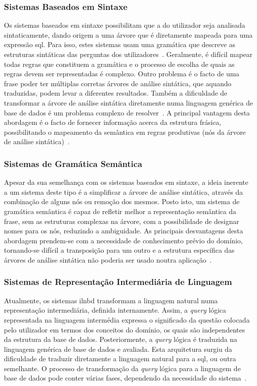 \subsubsection{Sistemas Baseados em Sintaxe}
Os sistemas baseados em sintaxe possibilitam que a  do utilizador seja analisada sintaticamente, dando origem a uma árvore que é diretamente mapeada para uma expressão \gls{sql}. Para isso, estes sistemas usam uma gramática que descreve as estruturas sintáticas das perguntas dos utilizadores~\parencite{nlidb_brief_review}. Geralmente, é difícil mapear todas regras que constituem a gramática e o processo de escolha de quais as regras devem ser representadas é complexo. Outro problema é o facto de uma frase poder ter múltiplas corretas árvores de análise sintática, que aquando traduzidas, podem levar a diferentes resultados. Também a dificuldade de transformar a árvore de análise sintática diretamente numa linguagem genérica de base de dados é um problema complexo de resolver~\parencite{survey_nlidb}. A principal vantagem desta abordagem é o facto de fornecer informação acerca da estrutura frásica, possibilitando o mapeamento da semântica em regras produtivas (nós da árvore de análise sintática)~\parencite{nlidb_brief_review}.

\subsubsection{Sistemas de Gramática Semântica}
Apesar da sua semelhança com os sistemas baseados em sintaxe, a ideia inerente a um sistema deste tipo é a simplificar a árvore de análise sintática, através da combinação de alguns nós ou remoção dos mesmos. Posto isto, um sistema de gramática semântica é capaz de refletir melhor a representação semântica da frase, sem as estruturas complexas na árvore, com a possibilidade de designar nomes para os nós, reduzindo a ambiguidade. As principais desvantagens desta abordagem prendem-se com a necessidade de conhecimento prévio do domínio, tornando-se difícil a transposição para um outro e a estrutura específica das árvores de análise sintática não poderia ser usado noutra aplicação~\parencite{survey_nlidb, nlidb_brief_review}.

\subsubsection{Sistemas de Representação Intermediária de Linguagem}
Atualmente, os sistemas \gls{ilnbd} transformam a linguagem natural numa representação intermediária, definida internamente. Assim, a \textit{query} lógica representada na linguagem intermédia expressa o significado da questão colocada pelo utilizador em termos dos conceitos do domínio, os quais são independentes da estrutura da base de dados. Posteriormente, a \textit{query} lógica é traduzida na linguagem genérica de base de dados e avaliada. Esta arquitetura surgiu da dificuldade de traduzir diretamente a linguagem natural para a \gls{sql}, ou outra semelhante. O processo de transformação da \textit{query} lógica para a linguagem de base de dados pode conter várias fases, dependendo da necessidade do sistema~\parencite{nlidb_brief_review}.